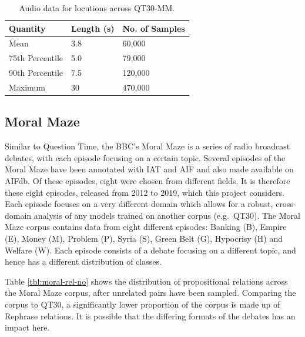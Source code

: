 \documentclass[twocolumn,twoside]{article}
\begin{document}
\begin{table}[h]
\centering
\caption{Audio data for locutions across QT30-MM.\label{tbl:audio-data-qt}}
\begin{tabular}{|l|ll|}
\hline
Quantity        & Length (s) & No. of Samples \\ \hline
Mean            & 3.8        & 60,000         \\
75th Percentile & 5.0        & 79,000         \\
90th Percentile & 7.5        & 120,000        \\
Maximum         & 30         & 470,000        \\ \hline
\end{tabular}
\end{table}

\subsection{Moral Maze}\label{moral-maze}

Similar to Question Time, the BBC's Moral Maze is a series of radio
broadcast debates, with each episode focusing on a certain topic.
Several episodes of the Moral Maze have been annotated with IAT and AIF
and also made available on AIFdb. Of these episodes, eight were chosen
from different fields. It is therefore these eight episodes, released
from 2012 to 2019, which this project considers. Each episode focuses on
a very different domain which allows for a robust, cross-domain analysis
of any models trained on another corpus (e.g.~QT30). The Moral Maze
corpus contains data from eight different episodes: Banking (B), Empire
(E), Money (M), Problem (P), Syria (S), Green Belt (G), Hypocrisy (H)
and Welfare (W). Each episode consists of a debate focusing on a
different topic, and hence has a different distribution of classes.

Table \ref{tbl:moral-rel-no} shows the distribution of propositional
relations across the Moral Maze corpus, after unrelated pairs have been
sampled. Comparing the corpus to QT30, a significantly lower proportion
of the corpus is made up of Rephrase relations. It is possible that the
differing formats of the debates has an impact here.
\end{document}

